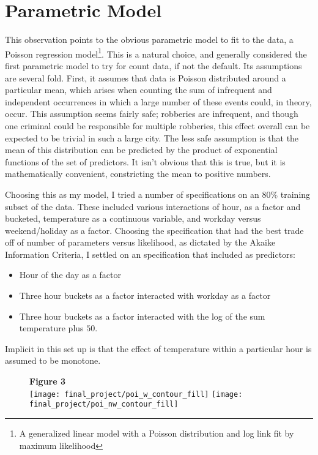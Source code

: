 \documentclass[11pt]{article}
\theoremstyle{definition}
\begin{document}
\section{Parametric Model} 
This observation points to the obvious parametric model to fit to the data, a Poisson regression model\footnote{A generalized linear model with a Poisson distribution and log link fit by maximum likelihood}. This is a natural choice, and generally considered the first parametric model to try for count data, if not the default. Its assumptions are several fold. First, it assumes that data is Poisson distributed around a particular mean, which arises when counting the sum of infrequent and independent occurrences in which a large number of these events could, in theory, occur. This assumption seems fairly safe; robberies are infrequent, and though one criminal could be responsible for multiple robberies, this effect overall can be expected to be trivial in such a large city. The less safe assumption is that the mean of this distribution can be predicted by the product of exponential functions of the set of predictors. It isn't obvious that this is true, but it is mathematically convenient, constricting the mean to positive numbers. \par
Choosing this as my model, I tried a number of specifications on an $80\%$ training subset of the data. These included various interactions of hour, as a factor and bucketed, temperature as a continuous variable, and workday versus weekend/holiday as a factor. Choosing the specification that had the best trade off of number of parameters versus likelihood, as dictated by the Akaike Information Criteria, I settled on an specification that included as predictors:
\begin{itemize}
    \item Hour of the day as a factor 
    \item Three hour buckets as a factor interacted with workday as a factor
    \item Three hour buckets as a factor interacted with the log of the sum temperature plus $50$.
\end{itemize}

Implicit in this set up is that the effect of temperature within a particular hour is assumed to be monotone. \par
\begin{figure}[h]
    {\bf Figure 3} \\
    \texttt{[image: final\_project/poi\_w\_contour\_fill]}
    \texttt{[image: final\_project/poi\_nw\_contour\_fill]}
\end{figure}
\end{document}
